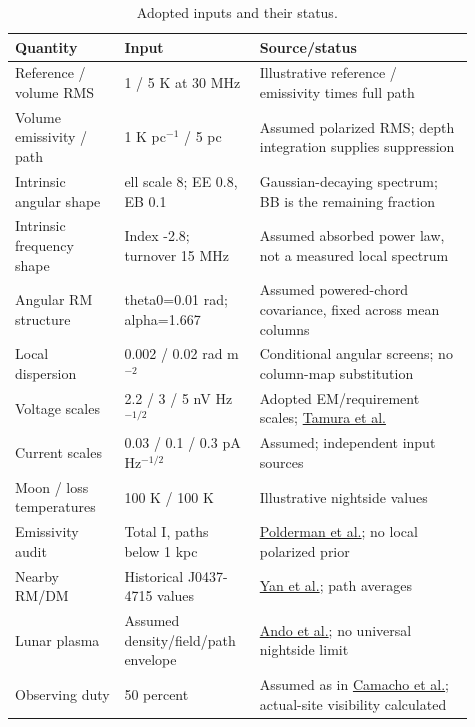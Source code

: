 \begin{table}[htbp]\centering\small
\caption{Adopted inputs and their status.}\label{tab:inputs}
\begin{tabular}{p{0.22\linewidth}p{0.26\linewidth}p{0.43\linewidth}}\toprule
Quantity & Input & Source/status\\\midrule
Reference / volume RMS & 1 / 5 K at 30 MHz & Illustrative reference / emissivity times full path\\
Volume emissivity / path & 1 K pc$^{-1}$ / 5 pc & Assumed polarized RMS; depth integration supplies suppression\\
Intrinsic angular shape & ell scale 8; EE 0.8, EB 0.1 & Gaussian-decaying spectrum; BB is the remaining fraction\\
Intrinsic frequency shape & Index -2.8; turnover 15 MHz & Assumed absorbed power law, not a measured local spectrum\\
Angular RM structure & theta0=0.01 rad; alpha=1.667 & Assumed powered-chord covariance, fixed across mean columns\\
Local dispersion & 0.002 / 0.02 rad m$^{-2}$ & Conditional angular screens; no column-map substitution\\
Voltage scales & 2.2 / 3 / 5 nV Hz$^{-1/2}$ & Adopted EM/requirement scales; \href{https://doi.org/10.1029/2023RS007925}{Tamura et al.}\\
Current scales & 0.03 / 0.1 / 0.3 pA Hz$^{-1/2}$ & Assumed; independent input sources\\
Moon / loss temperatures & 100 K / 100 K & Illustrative nightside values\\
Emissivity audit & Total I, paths below 1 kpc & \href{https://arxiv.org/html/1811.10310v1}{Polderman et al.}; no local polarized prior\\
Nearby RM/DM & Historical J0437-4715 values & \href{https://arxiv.org/pdf/1105.4213}{Yan et al.}; path averages\\
Lunar plasma & Assumed density/field/path envelope & \href{https://doi.org/10.1029/2011JA017141}{Ando et al.}; no universal nightside limit\\
Observing duty & 50 percent & Assumed as in \href{https://arxiv.org/html/2508.16773v2}{Camacho et al.}; actual-site visibility calculated\\
\bottomrule\end{tabular}\end{table}
